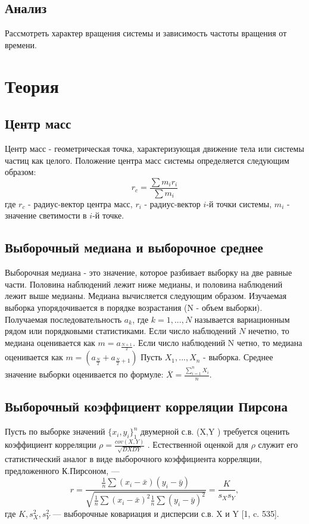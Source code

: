 \documentclass[a4paper,12pt]{article} %
\begin{document}
	\subsection{Анализ}
	Рассмотреть характер вращения системы и зависимость частоты вращения от времени.
	
	
	\section{Теория}
	\subsection{Центр масс}
	Центр масс - геометрическая точка, характеризующая движение тела или системы частиц как целого. 
	Положение центра масс системы определяется следующим образом:
	\begin{equation}
	r_{c}= \frac{\sum m_{i}r_{i}}{\sum m_{i}}
	\end{equation}
	где $r_{c}$ - радиус-вектор центра масс, $r_{i}$ -  радиус-вектор $i$-й точки системы, $m_{i}$ - значение светимости в $i$-й точке.
	
	\subsection{Выборочный медиана и выборочное среднее}
	Выборочная медиана - это значение, которое разбивает выборку на две равные части. Половина наблюдений лежит ниже медианы, и половина наблюдений лежит выше медианы.
	Медиана вычисляется следующим образом. Изучаемая выборка упорядочивается в порядке возрастания (N - объем выборки). Получаемая последовательность $a_{k}$, где $k=1,...,N$ называется вариационным рядом или порядковыми статистиками. Если число наблюдений $N$ нечетно, то медиана оценивается как $m=a_{\frac{N+1}{2}}$.
	Если число наблюдений N четно, то медиана оценивается как $m=(a_{\frac{N}{2}} + a_{\frac{N}{2} + 1})$
	\newline Пусть $X_{1}, ..., X_{n}$ - выборка. Среднее значение выборки оценивается по формуле: $\overline{X}= \frac{\sum_{i=1}^{n}X_{i}}{n}$.
	
	\subsection{Выборочный коэффициент корреляции Пирсона}
	Пусть по выборке значений $\{x_{i},y_{i}\}^{n}_{1}$ двумерной с.в. (X,Y ) требуется оценить коэффициент корреляции $\rho = \frac{cov(X,Y)}{\sqrt{DXDY}}$ . Естественной оценкой для $\rho$ служит его статистический аналог в виде выборочного коэффициента корреляции, предложенного К.Пирсоном, —
	\begin{equation}
	r = \frac{
		\frac{1}{n}\sum{(x_{i} - \bar{x})(y_{i}-\bar{y})}
	}{
		\sqrt{\frac{1}{n}\sum{(x_{i} - \bar{x})^{2}}\frac{1}{n}\sum{(y_{i} - \bar{y})^{2}}}
	}=\frac{K}{s_{X}s_{Y}},
	\label{r}
	\end{equation}
	где $K,s^{2}_{X},s^{2}_{Y}$ — выборочные ковариация и дисперсии с.в. X и Y [1, c. 535].
\end{document}
